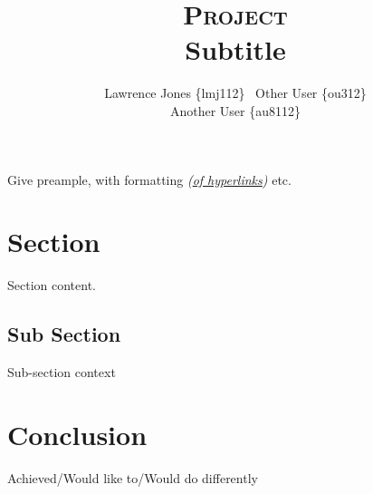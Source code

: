 \documentclass[a4paper]{article}
\title{\textsc{Project}\\Subtitle}
\author{Lawrence Jones \{lmj112\} \  Other User \{ou312\} \\
        Another User \{au8112\}}
\date{}
\begin{document}
\maketitle


Give preample, with formatting \textit{(\href{https://google.com}{of hyperlinks})} etc.

\section{Section}

Section content.

\subsection{Sub Section}

Sub-section context

\section{Conclusion}

Achieved/Would like to/Would do differently
\end{document}
